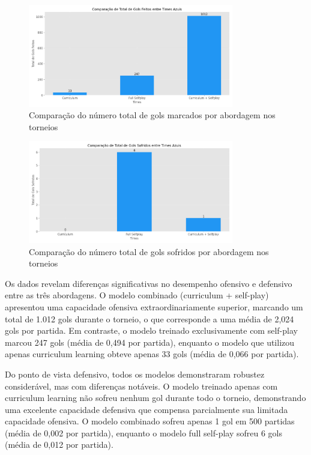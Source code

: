 \begin{figure}[H]
    \centering
    \includegraphics[width=0.8\textwidth]{fig/graficos_trabalho/graficos_torneios/geral/comparacao_gols_feitos.png}
    \caption{Comparação do número total de gols marcados por abordagem nos torneios}
    \label{fig:comparacao_gols_feitos}
\end{figure}

\begin{figure}[H]
    \centering
    \includegraphics[width=0.8\textwidth]{fig/graficos_trabalho/graficos_torneios/geral/comparacao_gols_sofridos.png}
    \caption{Comparação do número total de gols sofridos por abordagem nos torneios}
    \label{fig:comparacao_gols_sofridos}
\end{figure}

Os dados revelam diferenças significativas no desempenho ofensivo e defensivo entre as três abordagens. O modelo combinado (curriculum + self-play) apresentou uma capacidade ofensiva extraordinariamente superior, marcando um total de 1.012 gols durante o torneio, o que corresponde a uma média de 2,024 gols por partida. Em contraste, o modelo treinado exclusivamente com self-play marcou 247 gols (média de 0,494 por partida), enquanto o modelo que utilizou apenas curriculum learning obteve apenas 33 gols (média de 0,066 por partida).

Do ponto de vista defensivo, todos os modelos demonstraram robustez considerável, mas com diferenças notáveis. O modelo treinado apenas com curriculum learning não sofreu nenhum gol durante todo o torneio, demonstrando uma excelente capacidade defensiva que compensa parcialmente sua limitada capacidade ofensiva. O modelo combinado sofreu apenas 1 gol em 500 partidas (média de 0,002 por partida), enquanto o modelo full self-play sofreu 6 gols (média de 0,012 por partida).

